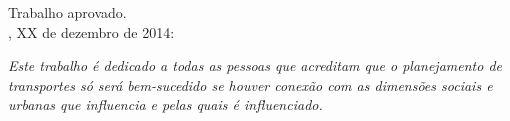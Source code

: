 \documentclass[
  12pt,        %
  openright,      %
  twoside,      %
  a4paper,      %
  english,      %
  brazil        %
]{abntex2}
\begin{document}
%
% 
%
\begin{folhadeaprovacao}

  \begin{center}
    {\ABNTEXchapterfont\large\imprimirautor}

    \vspace*{\fill}\vspace*{\fill}
    \begin{center}
      \ABNTEXchapterfont\bfseries\Large\imprimirtitulo
    \end{center}
    \vspace*{\fill}

    \hspace{.45\textwidth}
    \begin{minipage}{.5\textwidth}
        \imprimirpreambulo
    \end{minipage}%
    \vspace*{\fill}

   Trabalho aprovado. \\
   \imprimirlocal, XX de dezembro de 2014: 
   \end{center}

   \assinatura{\textbf{\imprimirorientador} \\ \imprimirorientadorRotulo}

   \begin{center}
    \vspace*{0.5cm}
    {\large\imprimirlocal}
    \par
    {\large\imprimirdata}
    \vspace*{1cm}
  \end{center}

\end{folhadeaprovacao}

\begin{dedicatoria}
   \vspace*{\fill}
   \centering
   \noindent
   \textit{Este trabalho é dedicado a todas as pessoas que acreditam que o planejamento de transportes só será bem-sucedido se houver conexão com as dimensões sociais e urbanas que influencia e pelas quais é influenciado.} \vspace*{\fill}
\end{dedicatoria}
\end{document}
